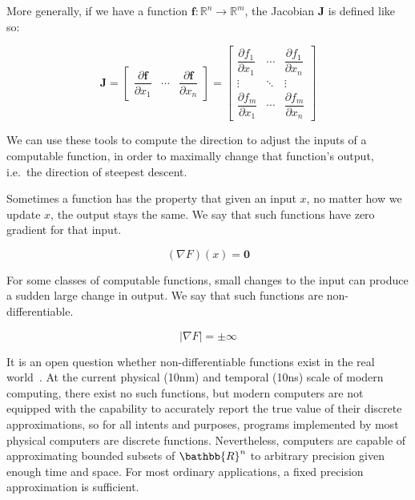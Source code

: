 \documentclass[12pt,initial,twoside,maitrise]{dms}
\numberwithin{equation}{section}
\numberwithin{table}{chapter}
\numberwithin{figure}{chapter}
\begin{document}
\noindent More generally, if we have a function $\mathbf{f}:  \mathbb{R}^n\rightarrow\mathbb{R}^m$, the Jacobian $\mathbf J$ is defined like so:

\begin{equation}
\mathbf J = \begin{bmatrix}
                       \dfrac{\partial \mathbf{f}}{\partial x_1} & \cdots & \dfrac{\partial \mathbf{f}}{\partial x_n} \end{bmatrix}
= \begin{bmatrix}
      \dfrac{\partial f_1}{\partial x_1} & \cdots & \dfrac{\partial f_1}{\partial x_n}\\
      \vdots & \ddots & \vdots\\
      \dfrac{\partial f_m}{\partial x_1} & \cdots & \dfrac{\partial f_m}{\partial x_n} \end{bmatrix}
\end{equation}

\noindent We can use these tools to compute the direction to adjust the inputs of a computable function, in order to maximally change that function's output, i.e.\ the direction of steepest descent.

Sometimes a function has the property that given an input $x$, no matter how we update $x$, the output stays the same. We say that such functions have zero gradient for that input.

\begin{equation}
    (\nabla F)(x) = \mathbf{0}
\end{equation}

For some classes of computable functions, small changes to the input can produce a sudden large change in output. We say that such functions are non-differentiable.

\begin{equation}
    |\nabla F| = \pm \infty
\end{equation}

It is an open question whether non-differentiable functions exist in the real world~\cite{buniy2005hilbert}. At the current physical (10nm) and temporal (10ns) scale of modern computing, there exist no such functions, but modern computers are not equipped with the capability to accurately report the true value of their discrete approximations, so for all intents and purposes, programs implemented by most physical computers are discrete functions. Nevertheless, computers are capable of approximating bounded subsets of $\bathbb{R}^n$ to arbitrary precision given enough time and space. For most ordinary applications, a fixed precision approximation is sufficient.
\end{document}
